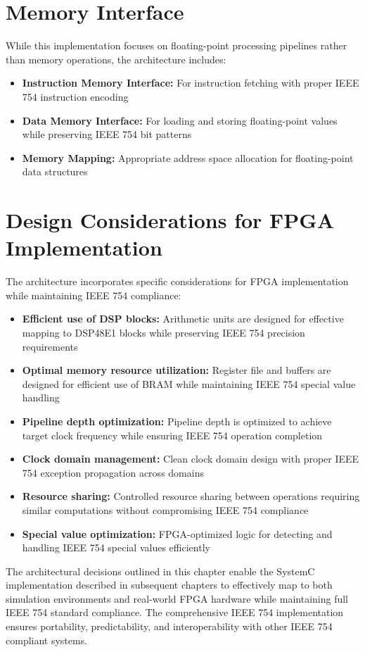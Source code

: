 \section{Memory Interface}
\label{sec:memory_interface}

While this implementation focuses on floating-point processing pipelines rather than memory operations, the architecture includes:

\begin{itemize}
\item \textbf{Instruction Memory Interface:} For instruction fetching with proper IEEE 754 instruction encoding
\item \textbf{Data Memory Interface:} For loading and storing floating-point values while preserving IEEE 754 bit patterns
\item \textbf{Memory Mapping:} Appropriate address space allocation for floating-point data structures
\end{itemize}

\section{Design Considerations for FPGA Implementation}
\label{sec:fpga_considerations}

The architecture incorporates specific considerations for FPGA implementation while maintaining IEEE 754 compliance:

\begin{itemize}
\item \textbf{Efficient use of DSP blocks:} Arithmetic units are designed for effective mapping to DSP48E1 blocks while preserving IEEE 754 precision requirements
\item \textbf{Optimal memory resource utilization:} Register file and buffers are designed for efficient use of BRAM while maintaining IEEE 754 special value handling
\item \textbf{Pipeline depth optimization:} Pipeline depth is optimized to achieve target clock frequency while ensuring IEEE 754 operation completion
\item \textbf{Clock domain management:} Clean clock domain design with proper IEEE 754 exception propagation across domains
\item \textbf{Resource sharing:} Controlled resource sharing between operations requiring similar computations without compromising IEEE 754 compliance
\item \textbf{Special value optimization:} FPGA-optimized logic for detecting and handling IEEE 754 special values efficiently
\end{itemize}

The architectural decisions outlined in this chapter enable the SystemC implementation described in subsequent chapters to effectively map to both simulation environments and real-world FPGA hardware while maintaining full IEEE 754 standard compliance. The comprehensive IEEE 754 implementation ensures portability, predictability, and interoperability with other IEEE 754 compliant systems.